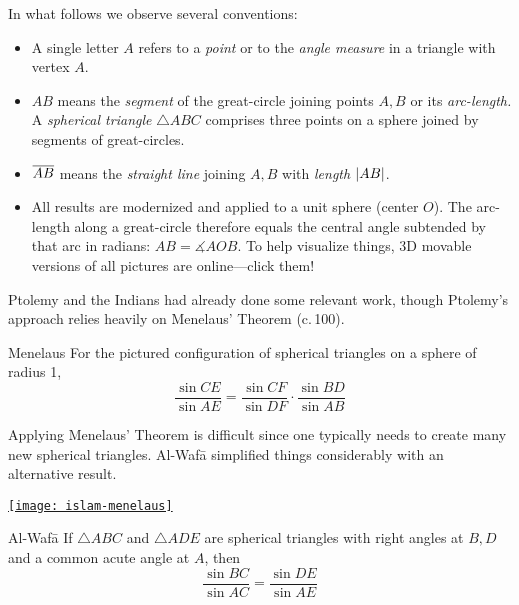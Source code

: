 \goodbreak



In what follows we observe several conventions:
\begin{itemize}\itemsep0pt
  \item A single letter $A$ refers to a \emph{point} or to the \emph{angle measure} in a triangle with vertex $A$.
  \item $AB$ means the \emph{segment} of the great-circle joining points $A,B$ or its \emph{arc-length.} A \emph{spherical triangle} $\triangle ABC$ comprises three points on a sphere joined by segments of great-circles.
  \item $\overline{AB}$ means the \emph{straight line} joining $A,B$ with \emph{length} $\left| AB\right|$.
  \item All results are modernized and applied to a unit sphere (center $O$). The arc-length along a great-circle therefore equals the central angle subtended by that arc in radians: $AB=\measuredangle AOB$. To help visualize things, 3D movable versions of all pictures are online---click them! 
\end{itemize}

\begin{minipage}[t]{0.75\linewidth}\vspace{-5pt}
	Ptolemy and the Indians had already done some relevant work, though Ptolemy's approach relies heavily on Menelaus' Theorem (c.\,100\AD).
	
	\begin{thm*}{Menelaus}{}
		For the pictured configuration of spherical triangles on a sphere of radius 1,
		\[
			\frac{\sin CE}{\sin AE}=\frac{\sin CF}{\sin DF}\cdot\frac{\sin BD}{\sin AB}
		\]
	\end{thm*}
	
	Applying Menelaus' Theorem is difficult since one typically needs to create many new spherical triangles. Al-Wafā simplified things considerably with an alternative result.
	\end{minipage}
	\hfill
	\begin{minipage}[t]{0.24\linewidth}\vspace{-5pt}
		\flushright
		\href{http://math.uci.edu/~ndonalds/math184/islam-menelaus.html}{\texttt{[image: islam-menelaus]}}
\end{minipage}
\medbreak




\begin{thm*}{Al-Wafā}{}
	If $\triangle ABC$ and $\triangle ADE$ are spherical triangles with right angles at $B,D$ and a common acute angle at $A$, then
	\[
		\frac{\sin BC}{\sin AC}=\frac{\sin DE}{\sin AE}
	\]
\end{thm*}

